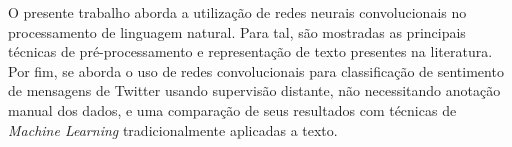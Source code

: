 O presente trabalho aborda a utilização de redes neurais convolucionais no processamento de linguagem natural.
Para tal, são mostradas as principais técnicas de pré-processamento e representação de texto presentes na literatura.
Por fim, se aborda o uso de redes convolucionais para classificação de sentimento de mensagens de Twitter usando supervisão distante,
não necessitando anotação manual dos dados, e uma comparação de seus resultados com técnicas de \textit{Machine Learning}
tradicionalmente aplicadas a texto.
